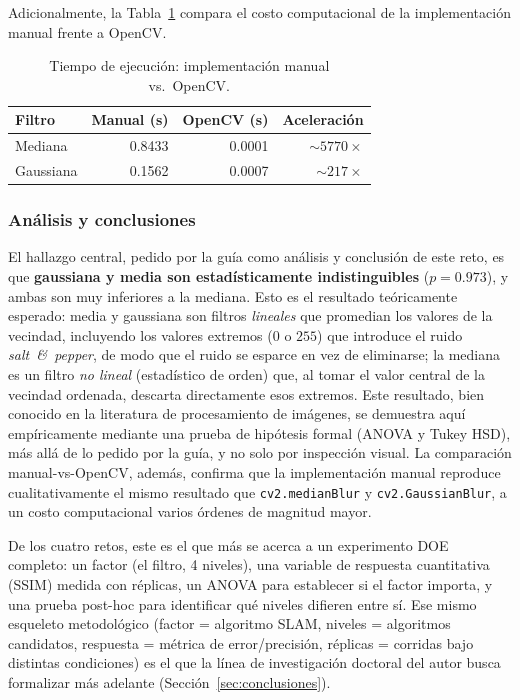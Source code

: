 \documentclass[11pt]{article}
\begin{document}
Adicionalmente, la Tabla~\ref{tab:reto4-tiempos} compara el costo
computacional de la implementación manual frente a OpenCV.

\begin{table}[h]
\centering
\caption{Tiempo de ejecución: implementación manual vs.\ OpenCV.}
\label{tab:reto4-tiempos}
\begin{tabular}{lrrr}
\toprule
Filtro & Manual (s) & OpenCV (s) & Aceleración \\
\midrule
Mediana & 0.8433 & 0.0001 & $\sim 5770\times$ \\
Gaussiana & 0.1562 & 0.0007 & $\sim 217\times$ \\
\bottomrule
\end{tabular}
\end{table}

\subsubsection{Análisis y conclusiones}
El hallazgo central, pedido por la guía como análisis y conclusión de este
reto, es que \textbf{gaussiana y media son estadísticamente
indistinguibles} ($p=0.973$), y ambas son muy inferiores a la mediana. Esto
es el resultado teóricamente esperado: media y gaussiana son filtros
\emph{lineales} que promedian los valores de la vecindad, incluyendo los
valores extremos ($0$ o $255$) que introduce el ruido \emph{salt~\&~pepper},
de modo que el ruido se esparce en vez de eliminarse; la mediana es un
filtro \emph{no lineal} (estadístico de orden) que, al tomar el valor
central de la vecindad ordenada, descarta directamente esos extremos. Este
resultado, bien conocido en la literatura de procesamiento de imágenes, se
demuestra aquí empíricamente mediante una prueba de hipótesis formal (ANOVA
y Tukey HSD), más allá de lo pedido por la guía, y no solo por inspección
visual. La comparación manual-vs-OpenCV, además, confirma que la
implementación manual reproduce cualitativamente el mismo resultado que
\texttt{cv2.medianBlur} y \texttt{cv2.GaussianBlur}, a un costo
computacional varios órdenes de magnitud mayor.

De los cuatro retos, este es el que más se acerca a un experimento DOE
completo: un factor (el filtro, 4 niveles), una variable de respuesta
cuantitativa (SSIM) medida con réplicas, un ANOVA para establecer si el
factor importa, y una prueba post-hoc para identificar qué niveles difieren
entre sí. Ese mismo esqueleto metodológico (factor = algoritmo SLAM,
niveles = algoritmos candidatos, respuesta = métrica de error/precisión,
réplicas = corridas bajo distintas condiciones) es el que la línea de
investigación doctoral del autor busca formalizar más adelante
(Sección~\ref{sec:conclusiones}).
\end{document}
